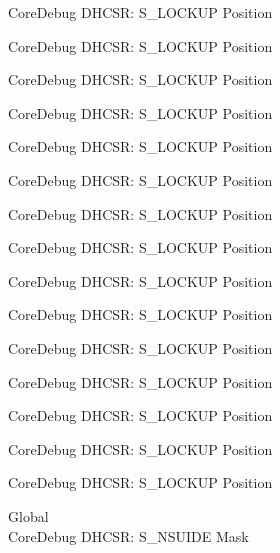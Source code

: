 \begin{DoxyRefList}
\label{deprecated__deprecated000113}%
%
Core\+Debug DHCSR\+: S\+\_\+\+LOCKUP Position 

\label{deprecated__deprecated000167}%
%
Core\+Debug DHCSR\+: S\+\_\+\+LOCKUP Position 

\label{deprecated__deprecated000252}%
%
Core\+Debug DHCSR\+: S\+\_\+\+LOCKUP Position 

\label{deprecated__deprecated000309}%
%
Core\+Debug DHCSR\+: S\+\_\+\+LOCKUP Position 

\label{deprecated__deprecated000385}%
%
Core\+Debug DHCSR\+: S\+\_\+\+LOCKUP Position 

\label{deprecated__deprecated000472}%
%
Core\+Debug DHCSR\+: S\+\_\+\+LOCKUP Position 

\label{deprecated__deprecated000574}%
%
Core\+Debug DHCSR\+: S\+\_\+\+LOCKUP Position 

\label{deprecated__deprecated000699}%
%
Core\+Debug DHCSR\+: S\+\_\+\+LOCKUP Position 

\label{deprecated__deprecated000791}%
%
Core\+Debug DHCSR\+: S\+\_\+\+LOCKUP Position 

\label{deprecated__deprecated000845}%
%
Core\+Debug DHCSR\+: S\+\_\+\+LOCKUP Position 

\label{deprecated__deprecated000930}%
%
Core\+Debug DHCSR\+: S\+\_\+\+LOCKUP Position 

\label{deprecated__deprecated000987}%
%
Core\+Debug DHCSR\+: S\+\_\+\+LOCKUP Position 

\label{deprecated__deprecated001063}%
%
Core\+Debug DHCSR\+: S\+\_\+\+LOCKUP Position 

\label{deprecated__deprecated001150}%
%
Core\+Debug DHCSR\+: S\+\_\+\+LOCKUP Position 

\label{deprecated__deprecated001252}%
%
Core\+Debug DHCSR\+: S\+\_\+\+LOCKUP Position  
\item[Global \doxylink{group___c_m_s_i_s___s_c_b_gabe0164afd9f6b8800fb7e05280e0ecda}{Core\+Debug\+\_\+\+DHCSR\+\_\+\+S\+\_\+\+NSUIDE\+\_\+\+Msk} ]\hfill \\
\label{deprecated__deprecated000018}%
%
Core\+Debug DHCSR\+: S\+\_\+\+NSUIDE Mask 


\end{DoxyRefList}
